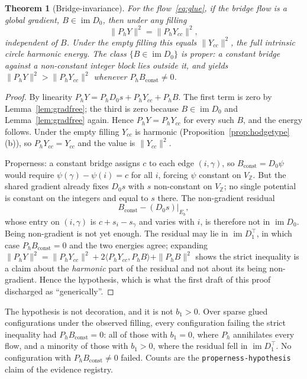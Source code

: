 \documentclass[11pt,a4paper]{article}
\newtheorem{theorem}{Theorem}
\theoremstyle{definition}
\theoremstyle{remark}
\newcommand{\Z}{\mathbb{Z}}
\newcommand{\im}{\operatorname{im}}
\newcommand{\Ph}{P_h}
\begin{document}
\begin{theorem}[Bridge-invariance]\label{thm:bridgeinv}
For the flow~\eqref{eq:glue}, if the bridge flow is a global gradient, $B\in\im D_0$, then under any filling
\[
\|\Ph Y\|^2=\|\Ph Y_{cc}\|^2,
\]
independent of $B$. Under the empty filling this equals $\|Y_{cc}\|^2$, the full intrinsic circle harmonic energy. The class $\{B\in\im D_0\}$ is proper: a constant bridge against a non-constant integer block lies outside it, and yields $\|\Ph Y\|^2>\|\Ph Y_{cc}\|^2$ whenever $\Ph B_{\mathrm{const}}\neq0$.
\end{theorem}
\begin{proof}
By linearity $\Ph Y=\Ph D_0s+\Ph Y_{cc}+\Ph B$. The first term is zero by Lemma~\ref{lem:gradfree}; the third is zero because $B\in\im D_0$ and Lemma~\ref{lem:gradfree} again. Hence $\Ph Y=\Ph Y_{cc}$ for every such $B$, and the energy follows. Under the empty filling $Y_{cc}$ is harmonic (Proposition~\ref{prop:hodgetype}(b)), so $\Ph Y_{cc}=Y_{cc}$ and the value is $\|Y_{cc}\|^2$.

Properness: a constant bridge assigns $c$ to each edge $(i,\gamma)$, so $B_{\mathrm{const}}=D_0\psi$ would require $\psi(\gamma)-\psi(i)=c$ for all $i$, forcing $\psi$ constant on $V_{\Z}$. But the shared gradient already fixes $D_0s$ with $s$ non-constant on $V_{\Z}$; no single potential is constant on the integers and equal to $s$ there. The non-gradient residual
\[
B_{\mathrm{const}}-(D_0s)\big|_{E_b},
\]
whose entry on $(i,\gamma)$ is $c+s_i-s_\gamma$ and varies with $i$, is therefore not in $\im D_0$. Being non-gradient is not yet enough. The residual may lie in $\im D_1^{\top}$, in which case $\Ph B_{\mathrm{const}}=0$ and the two energies agree; expanding $\|\Ph Y\|^2=\|\Ph Y_{cc}\|^2+2\langle\Ph Y_{cc},\Ph B\rangle+\|\Ph B\|^2$ shows the strict inequality is a claim about the \emph{harmonic} part of the residual and not about its being non-gradient. Hence the hypothesis, which is what the first draft of this proof discharged as ``generically''.
\end{proof}

The hypothesis is not decoration, and it is not $b_1>0$. Over sparse glued configurations under the observed filling, every configuration failing the strict inequality had $\Ph B_{\mathrm{const}}=0$: all of those with $b_1=0$, where $\Ph$ annihilates every flow, and a minority of those with $b_1>0$, where the residual fell in $\im D_1^{\top}$. No configuration with $\Ph B_{\mathrm{const}}\neq0$ failed. Counts are the \texttt{properness-hypothesis} claim of the evidence registry.
\end{document}
